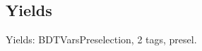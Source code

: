 
\subsection{Yields}

\begin{frame}{Yields: BDTVarsPreselection, 2 tags, presel.}
\begin{center}
  \begin{tabular}{l| >{\centering\let\newline\\\arraybackslash\hspace{0pt}}m{1.4cm}| >{\centering\let\newline\\\arraybackslash\hspace{0pt}}m{1.4cm}| >{\centering\let\newline\\\arraybackslash\hspace{0pt}}m{1.4cm}| >{\centering\let\newline\\\arraybackslash\hspace{0pt}}m{1.4cm}| >{\centering\let\newline\\\arraybackslash\hspace{0pt}}m{1.4cm}| >{\centering\let\newline\\\arraybackslash\hspace{0pt}}m{1.4cm}| >{\centering\let\newline\\\arraybackslash\hspace{0pt}}m{1.4cm}| >{\centering\let\newline\\\arraybackslash\hspace{0pt}}m{1.4cm}| >{\centering\let\newline\\\arraybackslash\hspace{0pt}}m{1.4cm}| >{\centering\let\newline\\\arraybackslash\hspace{0pt}}m{1.4cm}| >{\centering\let\newline\\\arraybackslash\hspace{0pt}}m{1.4cm}| >{\centering\let\newline\\\arraybackslash\hspace{0pt}}m{1.4cm}| >{\centering\let\newline\\\arraybackslash\hspace{0pt}}m{1.4cm}}

\end{tabular}
\end{center}
\end{frame}
